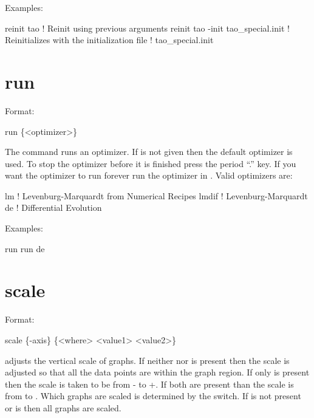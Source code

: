 Examples:
\begin{example}
  reinit tao                         ! Reinit using previous arguments
  reinit tao -init tao_special.init  ! Reinitializes \tao with the initialization file 
                                     !   tao_special.init
\end{example}


\section{run}
\label{s:run}

Format:
\begin{example}
  run \{<optimizer>\}
\end{example}

\vskip 0.2in 
The  command runs an optimizer. If  is not
given then the default optimizer is used. To stop the optimizer before
it is finished press the period ``.''  key. If you want the optimizer
to run forever run the optimizer in . Valid optimizers
are:
\begin{example}
  lm            ! Levenburg-Marquardt from Numerical Recipes 
  lmdif         ! Levenburg-Marquardt 
  de            ! Differential Evolution
\end{example}

Examples:
\begin{example}
  run 
  run de
\end{example}

\section{scale}
\label{s:scale}

Format:
\begin{example}
  scale \{-axis\} \{<where> <value1> <value2>\}
\end{example}

\vskip 0.2in 
 adjusts the vertical scale of graphs. If neither
 nor  is present then the scale is adjusted
so that all the data points are within the graph region.  If only
 is present then the scale is taken to be from
- to +. If both are present than the scale
is from  to .  Which graphs are scaled is
determined by the  switch. If  is not present
or  is  then all graphs are scaled.

